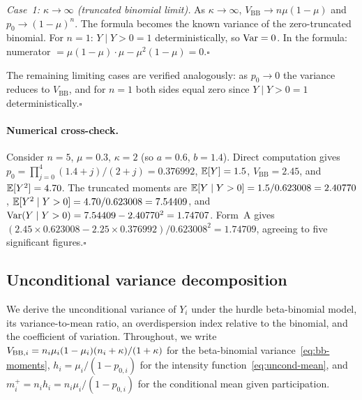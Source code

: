 \emph{Case~1: $\kappa \to \infty$ (truncated binomial limit).}
As $\kappa \to \infty$, $V_{\mathrm{BB}} \to n\mu(1-\mu)$ and
$p_0 \to (1-\mu)^n$.  The formula becomes the known variance of the
zero-truncated binomial.  For $n = 1$: $Y \mid Y > 0 = 1$
deterministically, so $\operatorname*{Var} = 0$.  In the formula: numerator
${}= \mu(1-\mu) \cdot \mu - \mu^2(1-\mu) = 0$.\enspace$\square$

The remaining limiting cases are verified analogously:
as $p_0 \to 0$ the variance reduces to $V_{\mathrm{BB}}$, and
for $n=1$ both sides equal zero since $Y \mid Y > 0 = 1$
deterministically.\enspace$\square$

\paragraph{Numerical cross-check.}
Consider $n = 5$, $\mu = 0.3$, $\kappa = 2$ (so $a = 0.6$, $b = 1.4$).
Direct computation gives
$p_0 = \prod_{j=0}^{4}(1.4+j)/(2+j) = 0.376992$,
$\mathbb{E}[Y] = 1.5$,
$V_{\mathrm{BB}} = 2.45$, and
$\mathbb{E}[Y^2] = 4.70$.
The truncated moments are
$\mathbb{E}[Y \mid Y > 0] = 1.5/0.623008 = 2.40770$,
$\mathbb{E}[Y^2 \mid Y > 0] = 4.70/0.623008 = 7.54409$, and
$\operatorname*{Var}(Y \mid Y > 0) = 7.54409 - 2.40770^2 = 1.74707$.
Form~A gives
$(2.45 \times 0.623008 - 2.25 \times 0.376992)/0.623008^2 = 1.74709$,
agreeing to five significant figures.\enspace$\square$


\subsection{Unconditional variance decomposition}\label{sma:vardecomp}

We derive the unconditional variance of $Y_i$ under the hurdle
beta-binomial model, its variance-to-mean ratio, an overdispersion index
relative to the binomial, and the coefficient of variation. Throughout, we
write $V_{\textup{BB},i} = n_i\mu_i(1-\mu_i)(n_i + \kappa)/(1 + \kappa)$
for the beta-binomial variance~\eqref{eq:bb-moments}, $h_i = \mu_i/(1-p_{0,i})$
for the intensity function~\eqref{eq:uncond-mean}, and
$m_i^{+} = n_i h_i = n_i\mu_i/(1-p_{0,i})$ for the conditional mean given
participation.

